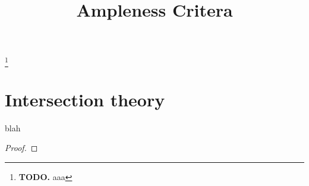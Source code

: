 


\newcommand{\todo}[1]{\footnote{\textbf{TODO.} #1}}

\title{Ampleness Critera}
\maketitle

\todo{aaa}

\section{Intersection theory}
\begin{lemma}
blah
\end{lemma}

\begin{proof}
\end{proof}





